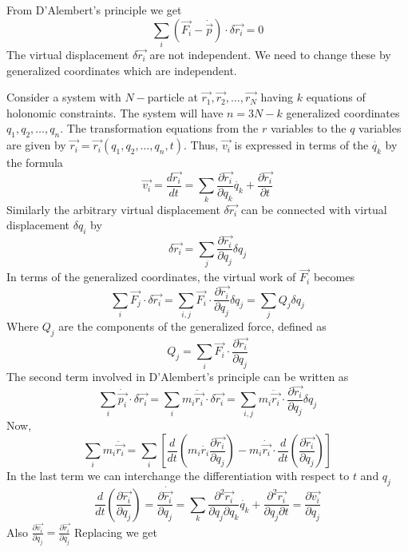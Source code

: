 \documentclass[12pt]{article}
\begin{document}
\begin{soln}
From D'Alembert's principle we get 
\begin{equation}
    \sum_i \left( \vec{F_i}-\dot{\vec{p}} \right)\cdot\delta \vec{r_i}=0\label{eq:lag1}
\end{equation}
The virtual displacement \(\delta \vec{r_i}\) are not independent. We need to change these by generalized coordinates which are independent.

Consider a system with \(N-\)particle at \(\vec{r_1},\vec{r_2},\dots,\vec{r_N}\) having \(k\) equations of holonomic constraints. The system will have \(n=3N-k\) generalized coordinates \(q_1,q_2,\dots,q_n\). The transformation equations from the \(r\) variables to the \(q\) variables are given by \(\vec{r_i}=\vec{r_i}(q_1,q_2,\dots,q_n,t)\). Thus, \(\vec{v_i}\) is expressed in terms of the \(\dot{q_k}\) by the formula 
\[
    \vec{v_i}=\frac{d\vec{r_i}}{dt}=\sum_k\frac{\partial \vec{r_i}}{\partial q_k}\dot{q_k}+\frac{\partial \vec{r_i}}{\partial t}
    \]
    Similarly the arbitrary virtual displacement \(\delta \vec{r_i}\) can be connected with virtual displacement \(\delta q_i\) by 
    \[
        \delta \vec{r_i}=\sum_j \frac{\partial \vec{r_i}}{\partial q_j}\delta q_j
        \]
        In terms of the generalized coordinates, the virtual work of \(\vec{F_i}\) becomes 
        \[
            \sum_i \vec{F_j}\cdot \delta \vec{r_i}=\sum_{i,j} \vec{F_i}\cdot\frac{\partial \vec{r_i}}{\partial q_j}\delta q_j=\sum_j Q_j \delta q_j
            \]
            Where \(Q_j\) are the components of the generalized force, defined as
\[
    Q_j=\sum_i \vec{F_i}\cdot \frac{\partial\vec{r_i}}{\partial q_j}
    \]
The second term involved in D'Alembert's principle can be written as 
\[
    \sum_i \dot{\vec{p_i}}\cdot\delta \vec{r_i}=\sum_i m_i\ddot{\vec{r_i}}\cdot\delta \vec{r_i}=\sum_{i,j} m_i\ddot{\vec{r_i}}\cdot \frac{\partial \vec{r_i}}{\partial q_j} \delta q_j
\]
Now,
\[
    \sum_i m_i\ddot{\vec{r_i}}=\sum_i\left[ \frac{d}{dt}\left( m_i\dot{r_i}\frac{\partial \vec{r_i}}{\partial q_j} \right)-m_i\dot{\vec{r_i}}\cdot\frac{d}{dt}\left( \frac{\partial \vec{r_i}}{\partial q_j} \right) \right]
    \]
    In the last term we can interchange the differentiation with respect to \(t\) and \(q_j\)
    \[
        \frac{d}{dt} \left( \frac{\partial \vec{r_i}}{\partial q_j} \right)=
        \frac{\partial \dot{\vec{r_i}}}{\partial q_j}=
    \sum_k \frac{\partial^2 \vec{r_i}}{\partial q_j \partial q_k}\dot{q_k}+\frac{\partial^2\vec{r_i}}{\partial q_j \partial t}=\frac{\partial \vec{v_i}}{\partial q_j}
    \]
    Also \(\frac{\partial \vec{v_i}}{\partial \dot{q_j}}=\frac{\partial \vec{r_i}}{\partial q_j}\) Replacing we get

\end{soln}
\end{document}

